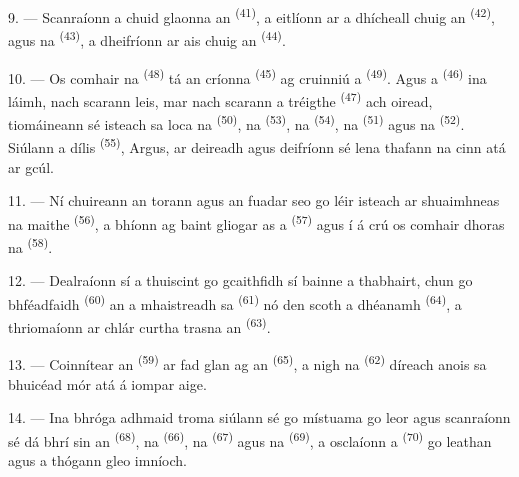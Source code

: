 9. --- Scanraíonn a chuid glaonna an  \textsuperscript{(41)}, a
eitlíonn ar a dhícheall chuig an  \textsuperscript{(42)}, agus na
 \textsuperscript{(43)}, a dheifríonn ar ais chuig an
 \textsuperscript{(44)}.

10. --- Os comhair na  \textsuperscript{(48)} tá an
 críonna \textsuperscript{(45)} ag cruinniú a 
\textsuperscript{(49)}. Agus a  \textsuperscript{(46)} ina láimh,
nach scarann leis, mar nach scarann a  tréigthe
\textsuperscript{(47)} ach oiread, tiomáineann sé isteach sa loca na
 \textsuperscript{(50)}, na 
\textsuperscript{(53)}, na  \textsuperscript{(54)}, na
 \textsuperscript{(51)} agus na 
\textsuperscript{(52)}. Siúlann a  dílis \textsuperscript{(55)},
Argus, ar deireadh agus deifríonn sé lena thafann na cinn atá ar gcúl.

11. --- Ní chuireann an torann agus an fuadar seo go léir isteach ar shuaimhneas na
 maithe \textsuperscript{(56)}, a bhíonn ag baint gliogar as a
 \textsuperscript{(57)} agus í á crú os comhair dhoras na
 \textsuperscript{(58)}.

12. --- Dealraíonn sí a thuiscint go gcaithfidh sí bainne a thabhairt, chun go
bhféadfaidh  \textsuperscript{(60)} an  a
mhaistreadh sa  \textsuperscript{(61)} nó 
den scoth a dhéanamh \textsuperscript{(64)}, a thriomaíonn ar chlár curtha trasna an
 \textsuperscript{(63)}.

13. --- Coinnítear an  \textsuperscript{(59)} ar fad glan ag an
 \textsuperscript{(65)}, a nigh na 
\textsuperscript{(62)} díreach anois sa bhuicéad mór atá á iompar aige.

\VUsaut{3.0mm}
\VUsaut{3.0mm}

14. --- Ina bhróga adhmaid troma siúlann sé go místuama go leor agus scanraíonn sé
dá bhrí sin an  \textsuperscript{(68)}, na 
\textsuperscript{(66)}, na  \textsuperscript{(67)} agus na
 \textsuperscript{(69)}, a osclaíonn a 
\textsuperscript{(70)} go leathan agus a thógann gleo imníoch.

